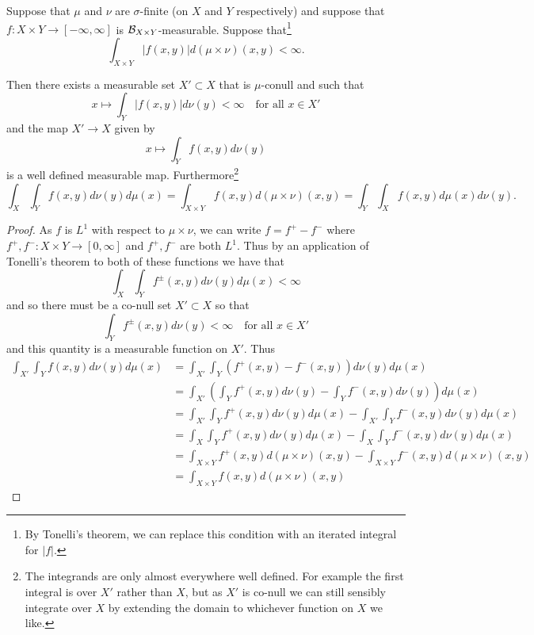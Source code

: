 \documentclass[twoside, a4paper, 10pt]{amsart}
\begin{document}
\begin{thm}  Suppose that $\mu$ and $\nu$ are $\sigma$-finite (on $X$ and $Y$ respectively) and suppose that $f:X \times Y \to [-\infty, \infty]$ is $\mathcal{B}_{X \times Y}$-measurable. Suppose that\footnote{By Tonelli's theorem, we can replace this condition with an iterated integral for $|f|$.} $$\int_{X \times Y} |f(x,y)| d(\mu \times \nu)(x,y) < \infty.$$

Then there exists a measurable set $X' \subset X$ that is $\mu$-conull and such that $$x \mapsto \int_{Y} |f(x,y)| d\nu(y) < \infty \quad\text{for all } x \in X'$$ and the map $X' \to X$ given by $$x \mapsto \int_{Y} f(x,y) d\nu(y) $$ is a well defined measurable map. Furthermore\footnote{The integrands are only almost everywhere well defined. For example the first integral is over $X'$ rather than $X$, but as $X'$ is co-null we can still sensibly integrate over $X$ by extending the domain to whichever function on $X$ we like.} $$\int_{X} \int_{Y} f(x,y) d\nu(y) d\mu(x)  = \int_{X \times Y} f(x,y) d(\mu \times \nu)(x,y)  = \int_{Y} \int_{X} f(x,y) d\mu(x) d\nu(y). $$

\end{thm}

\begin{proof} As $f$ is $L^1$ with respect to $\mu \times \nu$, we can write $f = f^+ - f^-$ where $f^+, f^-:X \times Y \to [0,\infty]$ and $f^+, f^-$ are both $L^1$. Thus by an application of Tonelli's theorem to both of these functions we have that $$\int_X \int_Y f^{\pm}(x,y) d\nu(y) d\mu(x) < \infty$$ and so there must be a co-null set $X' \subset X$ so that $$\int_Y f^{\pm}(x,y) d\nu(y) < \infty \quad \text{for all } x \in X'$$ and this quantity is a measurable function on $X'$.  Thus 
\begin{align*}\int_{X'} \int_Y f (x,y) d\nu(y) d\mu(x) &= \int_{X'} \int_Y \left(f^+(x,y) - f^-(x,y)\right) d\nu(y) d\mu(x) \\
&= \int_{X'}\left(\int_Y f^+(x,y) d\nu(y) - \int_Y f^-(x,y) d\nu(y) \right) d\mu(x) \\
&=  \int_{X'}\int_Y f^+(x,y) d\nu(y)d\mu(x) - \int_{X'}\int_Y f^-(x,y) d\nu(y)d\mu(x) \\ 
&=  \int_{X}\int_Y f^+(x,y) d\nu(y)d\mu(x) - \int_{X}\int_Y f^-(x,y) d\nu(y)d\mu(x) \\ 
&=  \int_{X \times Y} f^+(x,y) d(\mu \times \nu)(x,y) - \int_{X \times Y} f^-(x,y) d(\mu \times \nu)(x,y) \\
&= \int_{X \times Y} f(x,y) d(\mu \times \nu)(x,y)  \end{align*}
\end{proof}
\end{document}
